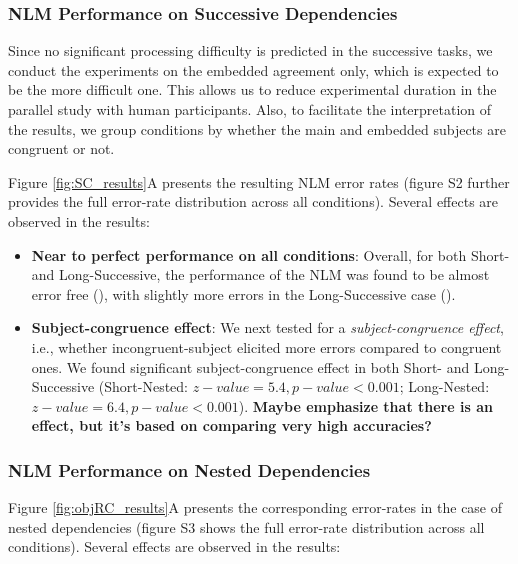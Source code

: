 \subsubsection{NLM Performance on Successive Dependencies}
Since no significant processing difficulty is predicted in the successive tasks, we conduct the experiments on the embedded agreement only, which is expected to be the more difficult one. 
This allows us to reduce experimental duration in the parallel study with human participants. Also, to facilitate the interpretation of the results, we group conditions by whether the main and embedded subjects are congruent or not.

Figure \ref{fig:SC_results}A presents the resulting NLM error rates (figure S2 further provides the full error-rate distribution across all conditions). Several effects are observed in the results: 

\begin{itemize}
    \item \textbf{Near to perfect performance on all conditions}: Overall, for both Short- and Long-Successive, the performance of the NLM was found to be almost error free (), with slightly more errors in the Long-Successive case (). 
    \item \textbf{Subject-congruence effect}: We next tested for a \textit{subject-congruence effect}, i.e., whether incongruent-subject elicited more errors compared to congruent ones. We found significant subject-congruence effect in both Short- and Long-Successive (Short-Nested: $z-value=5.4, p-value<0.001$; Long-Nested: $z-value=6.4, p-value<0.001$). \textbf{Maybe emphasize that there is an effect, but it's based on comparing very high accuracies?}
\end{itemize}
 
\subsubsection{NLM Performance on Nested Dependencies}
Figure \ref{fig:objRC_results}A presents the corresponding error-rates in the case of nested dependencies (figure S3 shows the full error-rate distribution across all conditions). Several effects are observed in the results:


